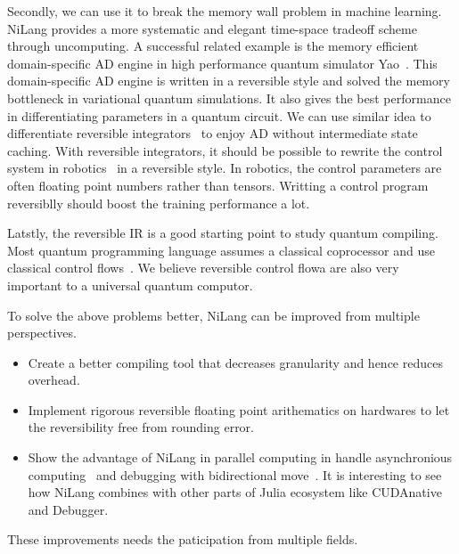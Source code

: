 \documentclass[aps,twocolumn,longbibliography,english,superscriptaddress]{revtex4-1}
\newcommand{\<}{\langle}
\renewcommand{\>}{\rangle}
\newcommand{\blue}[1]{[{\bf  \color{blue}{JG: #1}}]}
\theoremstyle{definition}\newtheorem{definition}{\textit{Definition}}
\begin{document}
Secondly, we can use it to break the memory wall problem in machine learning.
NiLang provides a more systematic and elegant time-space tradeoff scheme through uncomputing.
A successful related example is the memory efficient domain-specific AD engine in high performance quantum simulator Yao~\cite{Luo2019}.
This domain-specific AD engine is written in a reversible style and solved the memory bottleneck in variational quantum simulations. It also gives the best performance in differentiating parameters in a quantum circuit.
We can use similar idea to differentiate reversible integrators~\cite{Hut1995, Laikov2018} to enjoy AD without intermediate state caching.
With reversible integrators, it should be possible to rewrite the control system in robotics~\cite{Giftthaler2017} in a reversible style. In robotics, the control parameters are often floating point numbers rather than tensors.
Writting a control program reversiblly should boost the training performance a lot.

Latstly, the reversible IR is a good starting point to study quantum compiling. Most quantum programming language assumes a classical coprocessor and use classical control flows~\cite{Svore2018}.
We believe reversible control flowa are also very important to a universal quantum computor.

To solve the above problems better, NiLang can be improved from multiple perspectives.
\begin{itemize}
    \item Create a better compiling tool that decreases granularity and hence reduces overhead.
    \item Implement rigorous reversible floating point arithematics on hardwares to let the reversibility free from rounding error.
    \item Show the advantage of NiLang in parallel computing in handle asynchronious computing~\cite{Jefferson1985} and debugging with bidirectional move~\cite{Boothe2000}. It is interesting to see how NiLang combines with other parts of Julia ecosystem like CUDAnative~\cite{Besard2018} and Debugger.
\end{itemize}
These improvements needs the paticipation from multiple fields.

\end{document}
